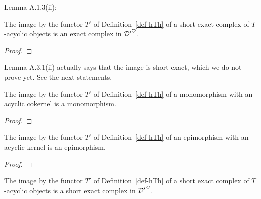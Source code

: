 Lemma A.1.3(ii):

\begin{lemma}
\label{prop-acyclic-shortexact_aux}
\leanok 
{}
The image by the functor $T'$ of Definition~\ref{def-hTh} of a short exact complex of $T$-acyclic objects
is an exact complex in ${\mathcal{D}'}^\heartsuit$.

\end{lemma}

\begin{proof}
\leanok
\end{proof}


\begin{remark}
Lemma A.3.1(ii) actually says that the image is short exact, which we do not prove yet.
See the next statements.

\end{remark}


\begin{lemma}
\label{prop-mono_map_of_mono_and_acyclicCokernel}
\leanok 
{}
The image by the functor $T'$ of Definition~\ref{def-hTh} of a monomorphism with an acyclic 
cokernel is a monomorphism.

\end{lemma}

\begin{proof}
\leanok
\end{proof}


\begin{lemma}
\label{prop-epi_map_of_epi_and_acyclicKernel}
\leanok 
{}
The image by the functor $T'$ of Definition~\ref{def-hTh} of an epimorphism with an acyclic 
kernel is an epimorphism.

\end{lemma}

\begin{proof}
\leanok
\end{proof}


\begin{lemma}
\label{prop-acyclic-shortexact}
\leanok 
{}
The image by the functor $T'$ of Definition~\ref{def-hTh} of a short exact complex of $T$-acyclic objects
is a short exact complex in ${\mathcal{D}'}^\heartsuit$.

\end{lemma}

